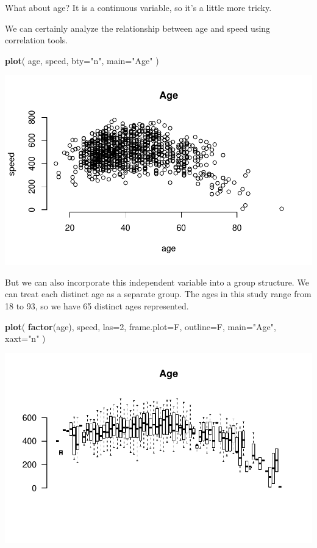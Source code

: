\documentclass[]{book}
\newenvironment{Shaded}{\begin{snugshade}}{\end{snugshade}}
\newcommand{\DataTypeTok}[1]{\textcolor[rgb]{0.13,0.29,0.53}{#1}}
\newcommand{\DecValTok}[1]{\textcolor[rgb]{0.00,0.00,0.81}{#1}}
\newcommand{\KeywordTok}[1]{\textcolor[rgb]{0.13,0.29,0.53}{\textbf{#1}}}
\newcommand{\NormalTok}[1]{#1}
\newcommand{\StringTok}[1]{\textcolor[rgb]{0.31,0.60,0.02}{#1}}
\theoremstyle{definition}
\theoremstyle{definition}
\theoremstyle{definition}
\theoremstyle{remark}
\begin{document}
What about age? It is a continuous variable, so it's a little more
tricky.

We can certainly analyze the relationship between age and speed using
correlation tools.

\begin{Shaded}
\begin{Highlighting}[]
\KeywordTok{plot}\NormalTok{( age, speed, }\DataTypeTok{bty=}\StringTok{"n"}\NormalTok{, }\DataTypeTok{main=}\StringTok{"Age"}\NormalTok{ )}
\end{Highlighting}
\end{Shaded}

\begin{center}\includegraphics[width=0.7\linewidth]{DS4PS-I_files/figure-latex/unnamed-chunk-164-1} \end{center}

But we can also incorporate this independent variable into a group
structure. We can treat each distinct age as a separate group. The ages
in this study range from 18 to 93, so we have 65 distinct ages
represented.

\begin{Shaded}
\begin{Highlighting}[]

\KeywordTok{plot}\NormalTok{( }\KeywordTok{factor}\NormalTok{(age), speed, }\DataTypeTok{las=}\DecValTok{2}\NormalTok{, }\DataTypeTok{frame.plot=}\NormalTok{F, }\DataTypeTok{outline=}\NormalTok{F, }\DataTypeTok{main=}\StringTok{"Age"}\NormalTok{, }\DataTypeTok{xaxt=}\StringTok{"n"}\NormalTok{  )}
\end{Highlighting}
\end{Shaded}

\begin{center}\includegraphics[width=0.7\linewidth]{DS4PS-I_files/figure-latex/unnamed-chunk-165-1} \end{center}
\end{document}
